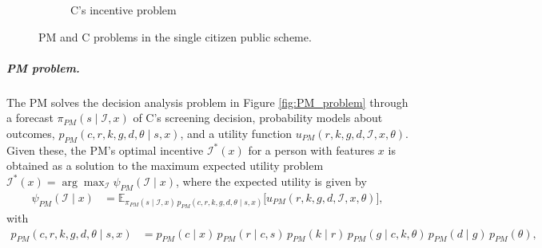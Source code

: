 \documentclass[12pt]{article}
\begin{document}
\begin{figure}[h!]
\begin{subfigure}[t]{0.48\textwidth}
{}
        \caption{C's incentive problem}
        \label{fig:citizen_problem}
    \end{subfigure}
    \caption{PM and C problems in the single citizen public scheme.}
    \label{fig:both_problems}
\end{figure}
\subparagraph{PM problem.} The PM solves the decision analysis problem in Figure \ref{fig:PM_problem} through a forecast $\pi_{PM}(s \mid \mathcal{I}, x)$ of C's screening decision, probability models about outcomes, $p_{PM}(c,r,k,g,d,\theta \mid s, x)$, and a utility function $u_{PM}(r,k,g,d,\mathcal{I},x, \theta)$. Given these, the PM's optimal incentive $\mathcal{I}^*(x)$ for a person with features $x$ is obtained as a solution to the maximum expected utility problem $\mathcal{I}^* (x)  =  \arg \max_{\mathcal{I}} \psi_{PM}(\mathcal{I} \mid x)$, where the expected utility is given by
\begin{align} \label{eq:max_util_PM}
  \psi_{PM}(\mathcal{I} \mid x) &= \mathbb{E}_{\pi_{PM}(s \mid \mathcal{I}, x)\, p_{PM}(c,r,k,g,d,\theta \mid s, x)} \big[u_{PM}(r,k,g,d,\mathcal{I},x, \theta)\big],
\end{align}
with
\begin{align} \label{eq:joint_dist}
    p_{PM}(c,r,k,g,d,\theta \mid s, x) &= p_{PM}(c \mid x)\, p_{PM}(r \mid c,s)\, p_{PM}(k \mid r)\, p_{PM}(g \mid c,k,\theta)\, p_{PM}(d \mid g)\, p_{PM}(\theta),
\end{align}
\end{document}
